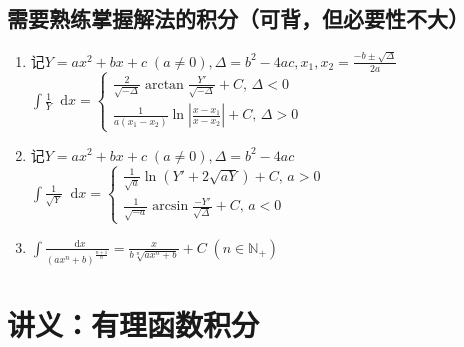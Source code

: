 \documentclass{ctexbook}
\newcommand*{\dif}{\mathop{}\!\mathrm{d}}
\begin{document}
\section{需要熟练掌握解法的积分（可背，但必要性不大）}
\begin{enumerate}
	\item 记$ Y=ax^{2}+bx+c\;\left(a\ne0\right),\Delta=b^{2}-4ac,x_{1},x_{2}=\frac{-b\pm\sqrt{\Delta}}{2a}$\\$\int\frac{1}{Y}\dif{x}=\begin{cases}\displaystyle\frac{2}{\sqrt{-\Delta}}\arctan{\frac{Y'}{\sqrt{-\Delta}}}+C,\,\Delta<0\\\displaystyle\frac{1}{a\left(x_{1}-x_{2}\right)}\ln{\left|\frac{x-x_{1}}{x-x_{2}}\right|}+C,\,\Delta>0\end{cases}$
	\item 记$ Y=ax^{2}+bx+c\;\left(a\ne0\right),\Delta=b^{2}-4ac$\\$\int\frac{1}{\sqrt{Y}}\dif{x}=\begin{cases}\displaystyle\frac{1}{\sqrt{a}}\ln{\left(Y'+2\sqrt{aY}\right)}+C,\,a>0\\\displaystyle\frac{1}{\sqrt{-a}}\arcsin{\frac{-Y'}{\sqrt{\Delta}}}+C,\,a<0\end{cases}$
	\item$\int\frac{\dif{x}}{\left(ax^{n}+b\right)^{\frac{n+1}{n}}}=\frac{x}{b\sqrt[n]{ax^{n}+b}}+C\;\left(n\in\mathbb{N_{+}}\right)$
\end{enumerate}
\par
\chapter{讲义：有理函数积分}
\end{document}
